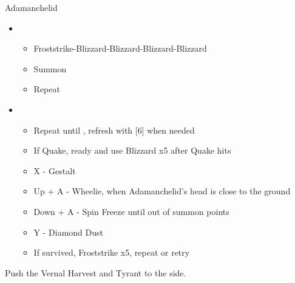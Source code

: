 \documentclass{report}
\begin{document}
\begin{battle}{Adamanchelid}
\begin{itemize}
    \item \sixth
    \begin{itemize}
        \item Froststrike-Blizzard-Blizzard-Blizzard-Blizzard
        \item Summon
        \item Repeat
    \end{itemize}
    \item \fifth
    \begin{itemize}
        \item Repeat until \stagger, refresh with [6] when needed
        \item If Quake, ready and use Blizzard x5 after Quake hits
        \item X - Gestalt
        \item Up + A - Wheelie, when Adamanchelid's head is close to the ground
        \item Down + A - Spin Freeze until out of summon points
        \item Y - Diamond Dust
        \item If survived, Froststrike x5, repeat or retry
    \end{itemize}
\end{itemize}
\end{battle}

Push the Vernal Harvest and Tyrant to the side.



\end{document}
